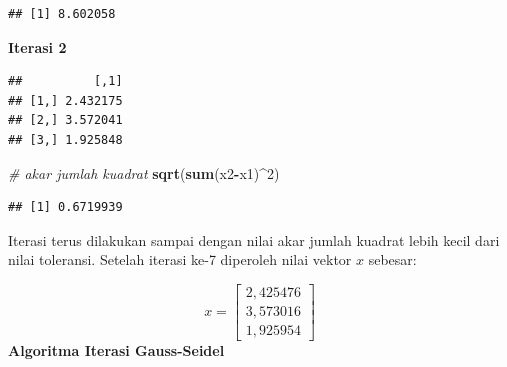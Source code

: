\documentclass[]{book}
\newenvironment{Shaded}{\begin{snugshade}}{\end{snugshade}}
\newcommand{\CommentTok}[1]{\textcolor[rgb]{0.56,0.35,0.01}{\textit{#1}}}
\newcommand{\DecValTok}[1]{\textcolor[rgb]{0.00,0.00,0.81}{#1}}
\newcommand{\KeywordTok}[1]{\textcolor[rgb]{0.13,0.29,0.53}{\textbf{#1}}}
\newcommand{\NormalTok}[1]{#1}
\newcommand{\OperatorTok}[1]{\textcolor[rgb]{0.81,0.36,0.00}{\textbf{#1}}}
\newcommand{\StringTok}[1]{\textcolor[rgb]{0.31,0.60,0.02}{#1}}
\theoremstyle{definition}
\theoremstyle{definition}
\theoremstyle{definition}
\theoremstyle{remark}
\begin{document}
\begin{verbatim}
## [1] 8.602058
\end{verbatim}

\textbf{Iterasi 2}

\begin{Shaded}
\end{Shaded}

\begin{verbatim}
##          [,1]
## [1,] 2.432175
## [2,] 3.572041
## [3,] 1.925848
\end{verbatim}

\begin{Shaded}
\begin{Highlighting}[]
\CommentTok{# akar jumlah kuadrat}
\KeywordTok{sqrt}\NormalTok{(}\KeywordTok{sum}\NormalTok{(x2}\OperatorTok{-}\NormalTok{x1)}\OperatorTok{^}\DecValTok{2}\NormalTok{)}
\end{Highlighting}
\end{Shaded}

\begin{verbatim}
## [1] 0.6719939
\end{verbatim}

Iterasi terus dilakukan sampai dengan nilai akar jumlah kuadrat lebih kecil dari nilai toleransi. Setelah iterasi ke-7 diperoleh nilai vektor \(x\) sebesar:

\[
x = \begin{bmatrix}
     2,425476     \\[0.3em]
     3,573016     \\[0.3em]
     1,925954
\end{bmatrix}
\]
\textbf{Algoritma Iterasi Gauss-Seidel}
\end{document}
